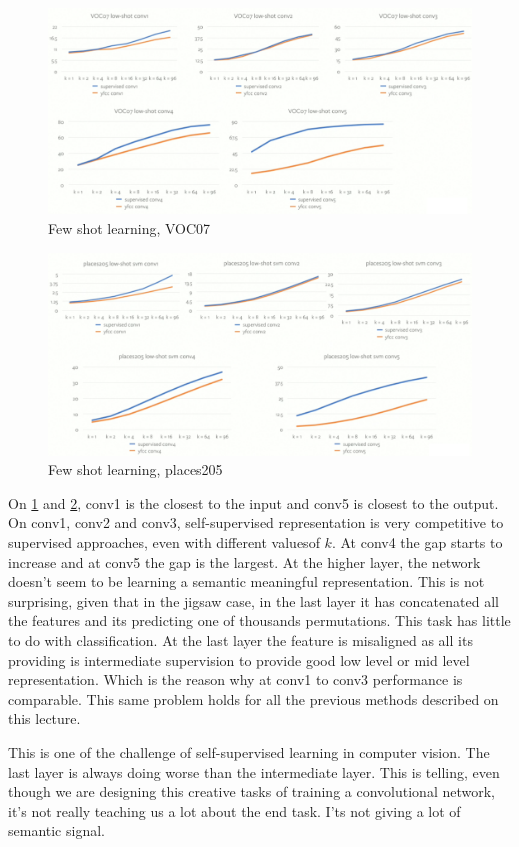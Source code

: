 \begin{figure}[H]
\centering
\includegraphics[width=0.8\linewidth]{lectures/13-b/graphics/VOC07.png}
\caption{Few shot learning, VOC07}\label{fig:VOC07}
\end{figure}
\begin{figure}[H]
\centering
\includegraphics[width=0.8\linewidth]{lectures/13-b/graphics/places205.png}
\caption{Few shot learning, places205}\label{fig:places205}
\end{figure}

On \ref{fig:VOC07} and \ref{fig:places205}, conv1 is the closest to the input and conv5 is closest to the output. On conv1, conv2 and conv3, self-supervised representation is very competitive to supervised approaches, even with different valuesof $k$. At conv4 the gap starts to increase and at conv5 the gap is the largest. At the higher layer, the network doesn't seem to be learning a semantic meaningful representation. This is not surprising, given that in the jigsaw case, in the last layer it has concatenated all the features and its predicting one of thousands permutations. This task has little to do with classification. At the last layer the feature is misaligned as all its providing is intermediate supervision to provide good low level or mid level representation. Which is the reason why at conv1 to conv3 performance is comparable. This same problem holds for all the previous methods described on this lecture.

This is one of the challenge of self-supervised learning in computer vision. The last layer is always doing worse than the intermediate layer. This is telling, even though we are designing this creative tasks of training a convolutional network, it’s not really teaching us a lot about the end task. I’ts not giving a lot of semantic signal.

